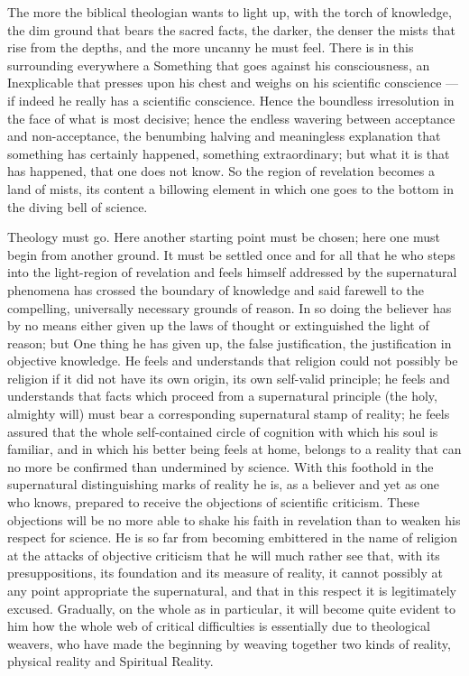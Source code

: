 \documentclass[12pt,a4paper,openany]{book}
\newcommand{\opage}[1]{\marginnote{\footnotesize\textit{[#1]}}}
\begin{document}
The more the biblical theologian wants to light up, with the torch of knowledge,
the dim ground that bears the sacred facts,
the darker, the denser the mists that rise from
the depths, and the more uncanny he must feel.
There is in this surrounding everywhere a Something that goes against his
consciousness, an Inexplicable that presses upon his
chest and weighs on his scientific conscience
--- if indeed he really has a scientific conscience.
Hence the boundless irresolution in the face of
what is most decisive; hence the endless wavering between acceptance
and non-acceptance, the benumbing halving and
meaningless explanation that something has certainly happened,
something extraordinary; but what it is that has happened, that
one does not know. So the region of revelation becomes a land
of mists, its content a billowing element in which
one goes to the bottom in the diving bell of science.

Theology must go. Here another starting point must be chosen;
here one must begin from another ground.
It must be settled once and for all that he who steps
into the light-region of revelation and feels himself addressed by
the supernatural phenomena has crossed the boundary
of knowledge and said farewell to the compelling, universally necessary
grounds of reason. In so doing the believer has by no means
either given up the laws of thought or extinguished the light of reason;
but One thing he has given up, the false justification, the
\setcounter{footnote}{0}%
\opage{7}justification in objective knowledge. He feels and understands that
religion could not possibly be religion if it did not
have its own origin, its own self-valid principle;
he feels and understands that facts which proceed
from a supernatural principle (the holy, almighty will)
must bear a corresponding supernatural stamp of reality;
he feels assured that the whole self-contained
circle of cognition with which his soul is familiar, and
in which his better being feels at home, belongs to a
reality that can no more be confirmed than undermined
by science. With this foothold in the
supernatural distinguishing marks of reality he is, as a believer
and yet as one who knows, prepared to receive the
objections of scientific criticism. These objections
will be no more able to shake his faith in
revelation than to weaken his respect for science.
He is so far from becoming embittered in the name of religion
at the attacks of objective criticism that he
will much rather see that, with its presuppositions,
its foundation and its measure of reality, it cannot possibly at any
point appropriate the supernatural, and that in this
respect it is legitimately excused. Gradually, on the whole as
in particular, it will become quite evident to him
how the whole web of critical difficulties is essentially
due to theological weavers, who have made the beginning
by weaving together two kinds of reality, physical
reality and Spiritual Reality.
\end{document}
